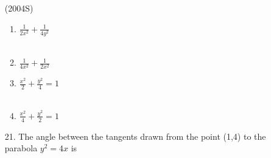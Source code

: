 \documentclass[journal,12pt,twocolumn]{IEEEtran}
\theoremstyle{remark}
\begin{document}
\begin{enumerate}
\hfill{(2004S)}
\begin{multicols}{2}
\begin{enumerate}
    \item $\frac{1}{2x^{2}}+\frac{1}{4y^{2}}$ \\\\
    \item $\frac{1}{4x^{2}}+\frac{1}{2x^{2}}$ 
    \item $\frac{x^{2}}{2}+\frac{y^{2}}{4}=1$ \\\\
    \item $\frac{x^{2}}{4}+\frac{y^{2}}{2}=1$ 
\end{enumerate}
\end{multicols}
\item[21.] The angle between the tangents drawn from the point (1,4) to the parabola $y^{2}=4x$ is 


\end{enumerate}
\end{document}
